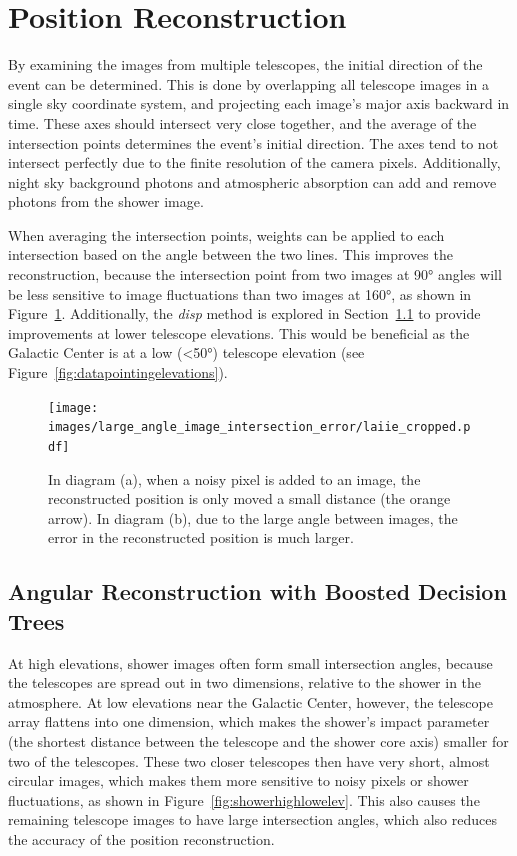 \section{Position Reconstruction}\label{subsec:posrecon}
By examining the images from multiple telescopes, the initial direction of the event can be determined.
This is done by overlapping all telescope images in a single sky coordinate system, and projecting each image's major axis backward in time.
These axes should intersect very close together, and the average of the intersection points determines the event's initial direction.
The axes tend to not intersect perfectly due to the finite resolution of the camera pixels.
Additionally, night sky background photons and atmospheric absorption can add and remove photons from the shower image.

When averaging the intersection points, weights can be applied to each intersection based on the angle between the two lines.
This improves the reconstruction, because the intersection point from two images at \ang{90} angles will be less sensitive to image fluctuations than two images at \ang{160}, as shown in Figure~\ref{fig:largeintersectangle}.
Additionally, the \textit{disp} method is explored in Section~\ref{subsec:disp} to provide improvements at lower telescope elevations.
This would be beneficial as the Galactic Center is at a low (<\ang{50}) telescope elevation (see Figure~\ref{fig:datapointingelevations}).

\begin{figure}[!t]
  \centering
  \texttt{[image: images/large\_angle\_image\_intersection\_error/laiie\_cropped.pdf]}
  \caption[Large Image Intersection Angles]{
    In diagram (a), when a noisy pixel is added to an image, the reconstructed position is only moved a small distance (the orange arrow).
    In diagram (b), due to the large angle between images, the error in the reconstructed position is much larger.
  }
  \label{fig:largeintersectangle}
\end{figure}
\FloatBarrier

\subsection{Angular Reconstruction with Boosted Decision Trees}\label{subsec:disp}
At high elevations, shower images often form small intersection angles, because the telescopes are spread out in two dimensions, relative to the shower in the atmosphere.
At low elevations near the Galactic Center, however, the telescope array flattens into one dimension, which makes the shower's impact parameter (the shortest distance between the telescope and the shower core axis) smaller for two of the telescopes.
These two closer telescopes then have very short, almost circular images, which makes them more sensitive to noisy pixels or shower fluctuations, as shown in Figure~\ref{fig:showerhighlowelev}.
This also causes the remaining telescope images to have large intersection angles, which also reduces the accuracy of the position reconstruction.

